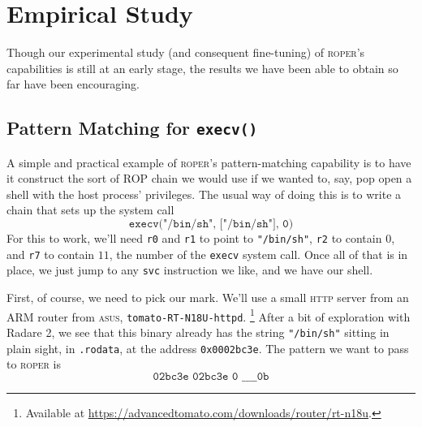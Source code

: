 

\section{Empirical Study}\label{sec:empirical}

Though our experimental study (and consequent fine-tuning) of
\textsc{roper}'s capabilities is still at an early stage, the
results we have been able to obtain so far have been encouraging. 

\subsection{Pattern Matching for \texttt{execv()}}

A simple and practical example of \textsc{roper}'s
pattern-matching capability is to have it construct the sort of
ROP chain we would use if we wanted to, say, pop open a
shell with the host process' privileges. The usual way of
doing this is to write a chain that sets up the system call
$$\texttt{execv("/bin/sh", ["/bin/sh"], 0)}$$
For this to work, we'll need \texttt{r0} and \texttt{r1} to point to
\texttt{"/bin/sh"}, \texttt{r2} to contain $0$, and
\texttt{r7} to contain $11$, the number of the \texttt{execv}
system call. Once all of that is in place, we just jump to any
\texttt{svc} instruction we like, and we have our shell.

First, of course, we need to pick our mark. We'll use a small
\textsc{http} server from an  ARM router from \textsc{asus},
\texttt{tomato-RT-N18U-httpd}.%
\footnote{Available at
\url{https://advancedtomato.com/downloads/router/rt-n18u}.}
After a bit of exploration with
Radare 2, we see that this binary already has the string
\texttt{"/bin/sh"} sitting in plain sight, in \texttt{.rodata},
at the address \texttt{0x0002bc3e}. The pattern we want to pass to
\textsc{roper} is
$$\texttt{02bc3e 02bc3e 0 \_ \_ \_ \_ 0b}$$

